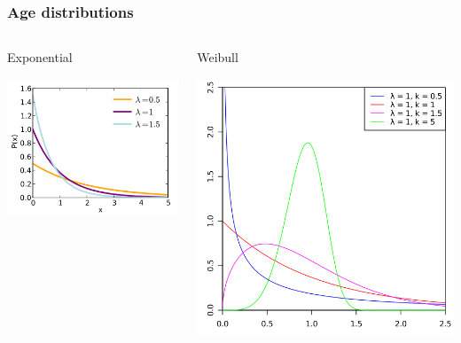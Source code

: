\documentclass{beamer}
\begin{document}
\begin{frame}
  \frametitle{Age distributions}

  \begin{columns}
    \begin{column}{0.5\textwidth}
      Exponential

      \includegraphics[height = 0.8\textheight, width = \textwidth, keepaspectratio = true]{figure/exponential}
    \end{column}
    \begin{column}{0.5\textwidth}
      Weibull

      \includegraphics[height = 0.8\textheight, width = \textwidth, keepaspectratio = true]{figure/weibull}
    \end{column}
  \end{columns}
  
  \tiny{}
\end{frame}
\end{document}
